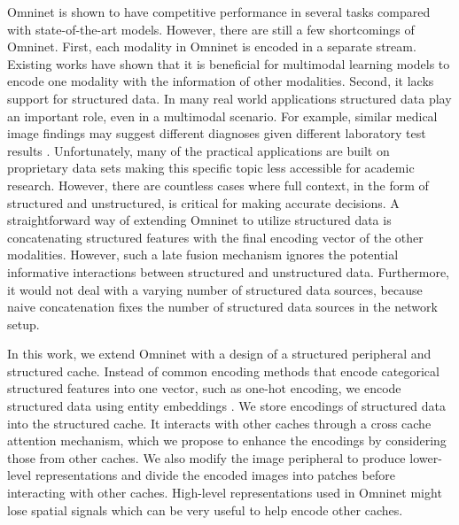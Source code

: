 \documentclass{article}
\begin{document}
Omninet is shown to have competitive performance in several tasks compared with state-of-the-art models. However, there are still a few shortcomings of Omninet. First, each modality in Omninet is encoded in a separate stream. Existing works \cite{tsai2019multimodal,tan2019lxmert,lu2019vilbert} have shown that it is beneficial for multimodal learning models to encode one modality with the information of other modalities. Second,  it lacks support for structured data. In many real world applications structured data play an important role, even in a multimodal scenario. For example, similar medical image findings may suggest different diagnoses given different laboratory test results \cite{huang2020fusion}. Unfortunately, many of the practical applications are built on proprietary data sets making this specific topic less accessible for academic research. However, there are countless cases where full context, in the form of structured and unstructured, is critical for making accurate decisions. A straightforward way of extending Omninet to utilize structured data is concatenating structured features with the final encoding vector of the other modalities. However, such a late fusion mechanism ignores the potential informative interactions between structured and unstructured data. Furthermore, it would not deal with a varying number of structured data sources, because naive concatenation fixes the number of structured data sources in the network setup. 

In this work, we extend Omninet with a design of a structured peripheral and structured cache. Instead of common encoding methods that encode categorical structured features into one vector, such as one-hot encoding, we encode structured data using entity embeddings \cite{guo2016entity}. We store encodings of structured data into the structured cache. It interacts with other caches through a cross cache attention mechanism, which we propose to enhance the encodings by considering those from other caches. We also modify the image peripheral to produce lower-level representations and divide the encoded images into patches before interacting with other caches. High-level representations used in Omninet might lose spatial signals which can be very useful to help encode other caches. %
\end{document}
